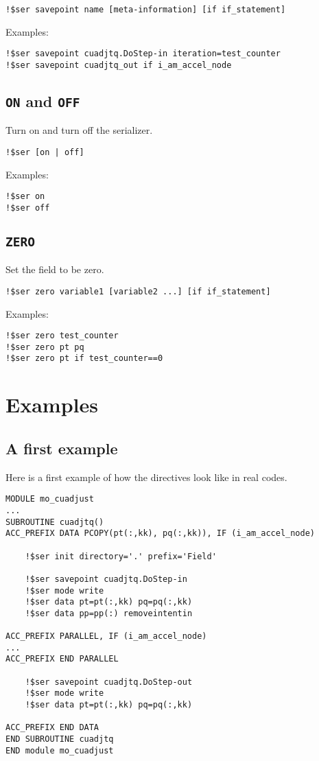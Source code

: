\documentclass{article}
\begin{document}
\begin{lstlisting}
!$ser savepoint name [meta-information] [if if_statement]
\end{lstlisting}

Examples:
\begin{lstlisting}
!$ser savepoint cuadjtq.DoStep-in iteration=test_counter
!$ser savepoint cuadjtq_out if i_am_accel_node
\end{lstlisting}


\subsection{\texttt{ON} and \texttt{OFF}}
Turn on and turn off the serializer.
\begin{lstlisting}
!$ser [on | off]
\end{lstlisting}

Examples:
\begin{lstlisting}
!$ser on
!$ser off
\end{lstlisting}

\subsection{\texttt{ZERO}}
Set the field to be zero.
\begin{lstlisting}
!$ser zero variable1 [variable2 ...] [if if_statement]
\end{lstlisting}

Examples:
\begin{lstlisting}
!$ser zero test_counter
!$ser zero pt pq
!$ser zero pt if test_counter==0
\end{lstlisting}

\section{Examples}
\label{sec:examples}

\subsection{A first example}
\label{ex:first}
Here is a first example of how the directives look like in real codes.
\begin{lstlisting}
MODULE mo_cuadjust
...
SUBROUTINE cuadjtq()
ACC_PREFIX DATA PCOPY(pt(:,kk), pq(:,kk)), IF (i_am_accel_node)

    !$ser init directory='.' prefix='Field'

    !$ser savepoint cuadjtq.DoStep-in
    !$ser mode write
    !$ser data pt=pt(:,kk) pq=pq(:,kk)
    !$ser data pp=pp(:) removeintentin

ACC_PREFIX PARALLEL, IF (i_am_accel_node)
...
ACC_PREFIX END PARALLEL

    !$ser savepoint cuadjtq.DoStep-out
    !$ser mode write
    !$ser data pt=pt(:,kk) pq=pq(:,kk)

ACC_PREFIX END DATA
END SUBROUTINE cuadjtq
END module mo_cuadjust
\end{lstlisting}
\end{document}
